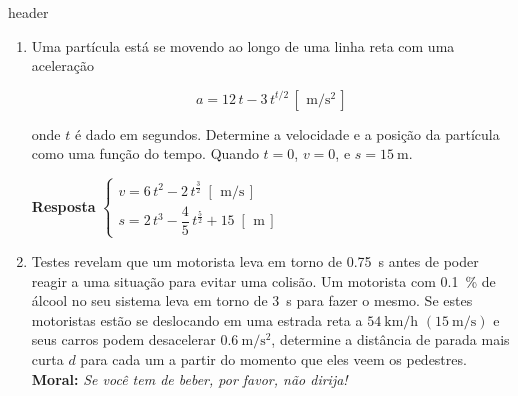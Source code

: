 \documentclass[a4paper,12pt]{article}
\begin{document}
	 {header}
	
	\begin{enumerate}
		\item Uma partícula está se movendo ao longo de uma linha reta com uma aceleração
		
		\begin{equation}
		a=12\,t-3\,t^{t/2}\, [\,\SI{}{\meter/\second^{2}}\,]
		\end{equation}
		
		onde $t$ é dado em segundos. Determine a velocidade e a posição da partícula como uma função
		do tempo. Quando $t=0$, $v=0$, e $s=\SI{15}{\meter}$.
		
		
		\textbf{Resposta}
		$
		\begin{cases}
		v=6\,t^{2}-2\,t^{\frac{3}{2}}\;[\,\SI{}{\meter/\second}\,]\\
		s=2\,t^{3}-\dfrac{4}{5}\,t^{\frac{5}{2}}+15\;[\,\SI{}{\meter}\,]
		\end{cases}
		$
		
		
		\item Testes revelam que um motorista leva em torno de \SI{0.75}{\second} antes de poder reagir a uma
		situação para evitar uma colisão. Um motorista com \SI{0.1}{\percent} de álcool no seu sistema leva em torno de \SI{3}{\second} para fazer o mesmo. Se estes motoristas estão se deslocando em uma estrada reta a $\SI{54}{\kilo\meter/\hour}$ $(\SI{15}{\meter/\second})$ e seus carros podem desacelerar $\SI{0.6}{\meter/\second^{2}}$, determine a distância de parada mais curta $d$ para
		cada um a partir do momento que eles veem os pedestres. \textbf{Moral:} \textit{Se você tem de beber, por favor, não dirija!}
		

\end{enumerate}
\end{document}
